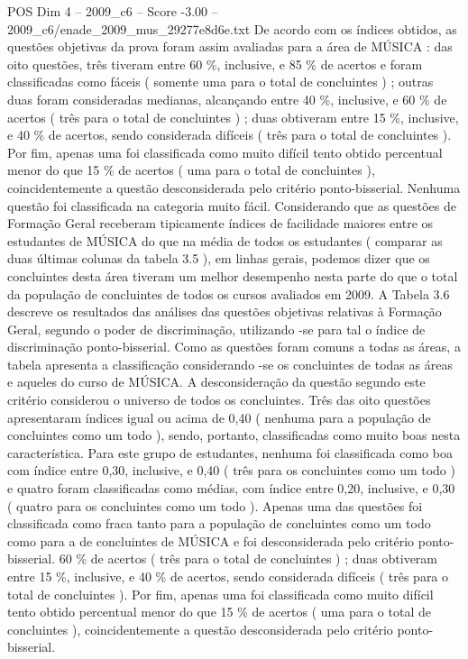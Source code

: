 \begin{textsample}{POS Dim 4 – 2009\_c6 – Score -3.00 – 2009\_c6/enade\_2009\_mus\_29277e8d6e.txt}
De acordo com os índices obtidos, as questões objetivas da prova foram assim avaliadas para a área de MÚSICA : das oito questões, três tiveram entre 60 \%, inclusive, e 85 \% de acertos e foram classificadas como fáceis ( somente uma para o total de concluintes ) ; outras duas foram consideradas medianas, alcançando entre 40 \%, inclusive, e 60 \% de acertos ( três para o total de concluintes ) ; duas obtiveram entre 15 \%, inclusive, e 40 \% de acertos, sendo considerada difíceis ( três para o total de concluintes ).
Por fim, apenas uma foi classificada como muito difícil tento obtido percentual menor do que 15 \% de acertos ( uma para o total de concluintes ), coincidentemente a questão desconsiderada pelo critério ponto-bisserial.
Nenhuma questão foi classificada na categoria muito fácil.
Considerando que as questões de Formação Geral receberam tipicamente índices de facilidade maiores entre os estudantes de MÚSICA do que na média de todos os estudantes ( comparar as duas últimas colunas da tabela 3.5 ), em linhas gerais, podemos dizer que os concluintes desta área tiveram um melhor desempenho nesta parte do que o total da população de concluintes de todos os cursos avaliados em 2009.
A Tabela 3.6 descreve os resultados das análises das questões objetivas relativas à Formação Geral, segundo o poder de discriminação, utilizando -se para tal o índice de discriminação ponto-bisserial.
Como as questões foram comuns a todas as áreas, a tabela apresenta a classificação considerando -se os concluintes de todas as áreas e aqueles do curso de MÚSICA.
A desconsideração da questão segundo este critério considerou o universo de todos os concluintes.
Três das oito questões apresentaram índices igual ou acima de 0,40 ( nenhuma para a população de concluintes como um todo ), sendo, portanto, classificadas como muito boas nesta característica.
Para este grupo de estudantes, nenhuma foi classificada como boa com índice entre 0,30, inclusive, e 0,40 ( três para os concluintes como um todo ) e quatro foram classificadas como médias, com índice entre 0,20, inclusive, e 0,30 ( quatro para os concluintes como um todo ).
Apenas uma das questões foi classificada como fraca tanto para a população de concluintes como um todo como para a de concluintes de MÚSICA e foi desconsiderada pelo critério ponto-bisserial. 60 \% de acertos ( três para o total de concluintes ) ; duas obtiveram entre 15 \%, inclusive, e 40 \% de acertos, sendo considerada difíceis ( três para o total de concluintes ).
Por fim, apenas uma foi classificada como muito difícil tento obtido percentual menor do que 15 \% de acertos ( uma para o total de concluintes ), coincidentemente a questão desconsiderada pelo critério ponto-bisserial.

\end{textsample}

